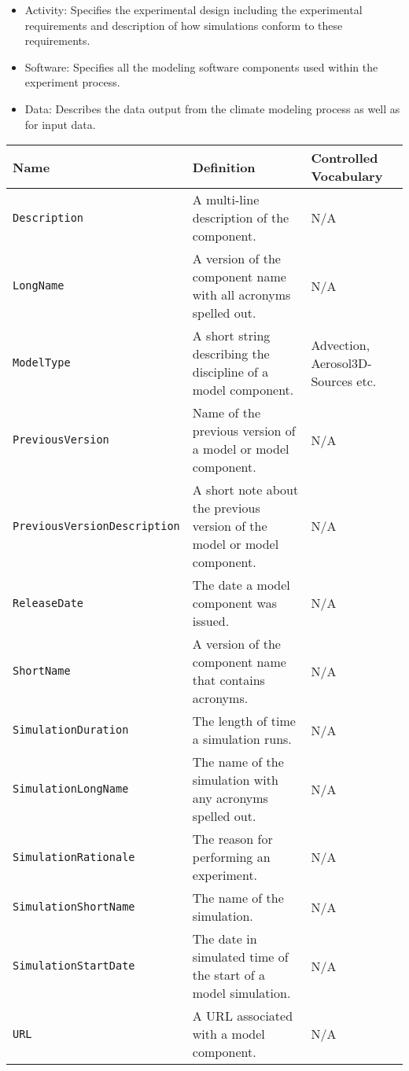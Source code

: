 \begin{itemize}
\begin{itemize}
       \item Activity: Specifies the experimental design including the experimental requirements and description of how simulations conform to these requirements.
       \item Software: Specifies all the modeling software components used within the experiment process. 
       \item Data: Describes the data output from the climate modeling process as well as for input data. 
    \end{itemize}
\end{itemize}

\begin{tabular}{|p{5cm}|p{7cm}|p{5cm}}
     {\bf Name} & {\bf Definition} & {\bf Controlled Vocabulary}\\
     \hline\hline
     {\tt Description} & A multi-line description of the component. & N/A \\
     {\tt LongName} & A version of the component name with all acronyms spelled out. & N/A\\
     {\tt ModelType} & A short string describing the discipline of a model component. & Advection, Aerosol3D-Sources etc.\\
     {\tt PreviousVersion} & Name of the previous version of a model or model component. & N/A\\ 
     {\tt PreviousVersionDescription} &  A short note about the previous version of the model or model component. & N/A \\ 
     {\tt ReleaseDate} & The date a model component was issued. & N/A \\
     {\tt ShortName} & A version of the component name that contains acronyms. & N/A \\
     {\tt SimulationDuration} & The length of time a simulation runs. & N/A \\
     {\tt SimulationLongName} & The name of the simulation with any acronyms spelled out. & N/A \\ 
     {\tt SimulationRationale} & The reason for performing an experiment. & N/A\\
     {\tt SimulationShortName} & The name of the simulation. & N/A \\
     {\tt SimulationStartDate} & The date in simulated time of the start of a model simulation. & N/A\\ 
     {\tt URL} & A URL associated with a model component. & N/A \\
\end{tabular}


